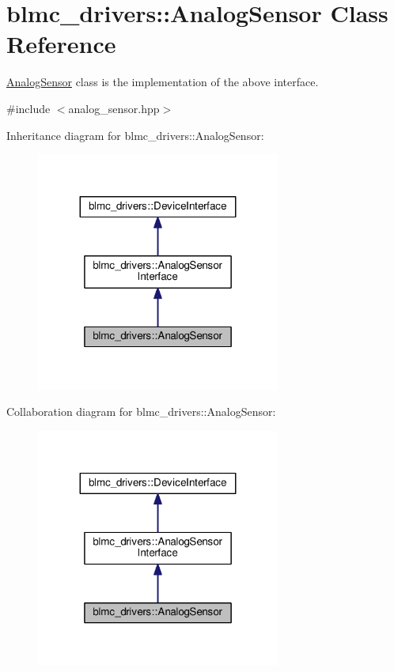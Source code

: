 \hypertarget{classblmc__drivers_1_1AnalogSensor}{}\section{blmc\+\_\+drivers\+:\+:Analog\+Sensor Class Reference}
\label{classblmc__drivers_1_1AnalogSensor}


\hyperlink{classblmc__drivers_1_1AnalogSensor}{Analog\+Sensor} class is the implementation of the above interface.  




{\ttfamily \#include $<$analog\+\_\+sensor.\+hpp$>$}



Inheritance diagram for blmc\+\_\+drivers\+:\+:Analog\+Sensor\+:
\nopagebreak
\begin{figure}[H]
\begin{center}
\leavevmode
\includegraphics[width=227pt]{classblmc__drivers_1_1AnalogSensor__inherit__graph}
\end{center}
\end{figure}


Collaboration diagram for blmc\+\_\+drivers\+:\+:Analog\+Sensor\+:
\nopagebreak
\begin{figure}[H]
\begin{center}
\leavevmode
\includegraphics[width=227pt]{classblmc__drivers_1_1AnalogSensor__coll__graph}
\end{center}
\end{figure}
